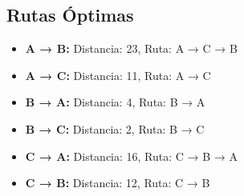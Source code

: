 \documentclass[12pt]{article}
\begin{document}
\clearpage
\subsection{Rutas Óptimas}
\begin{itemize}
\item \textbf{A → B:} Distancia: 23, Ruta: A → C → B
\item \textbf{A → C:} Distancia: 11, Ruta: A → C
\item \textbf{B → A:} Distancia: 4, Ruta: B → A
\item \textbf{B → C:} Distancia: 2, Ruta: B → C
\item \textbf{C → A:} Distancia: 16, Ruta: C → B → A
\item \textbf{C → B:} Distancia: 12, Ruta: C → B
\end{itemize}
\end{document}
